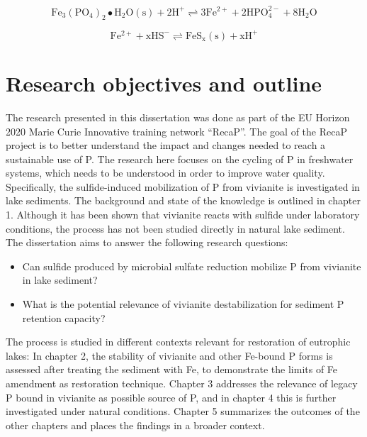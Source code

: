 \documentclass[12pt,twoside]{book}
\providecommand{\tightlist}{%
  \setlength{\itemsep}{0pt}\setlength{\parskip}{0pt}}
\begin{document}
\begin{equation}
  \mathrm{Fe_3(PO_{4})_2\bullet H_2O(s) + 2H^+} \rightleftharpoons \mathrm{3Fe^{2+} + 2HPO_4^{2-} + 8H_2O}
  \label{eq:vivianitedissolve}
\end{equation}

\begin{equation}
  \mathrm{Fe^{2+} + xHS^-} \rightleftharpoons \mathrm{FeS_x(s) + xH^+}
  \label{eq:sulfideform}
\end{equation}

\section{Research objectives and outline}\label{research-objectives-and-outline}

The research presented in this dissertation was done as part of the EU Horizon 2020 Marie Curie Innovative training network ``RecaP''. The goal of the RecaP project is to better understand the impact and changes needed to reach a sustainable use of P. The research here focuses on the cycling of P in freshwater systems, which needs to be understood in order to improve water quality. Specifically, the sulfide-induced mobilization of P from vivianite is investigated in lake sediments. The background and state of the knowledge is outlined in chapter 1. Although it has been shown that vivianite reacts with sulfide under laboratory conditions, the process has not been studied directly in natural lake sediment. The dissertation aims to answer the following research questions:

\begin{itemize}
\tightlist
\item
  Can sulfide produced by microbial sulfate reduction mobilize P from vivianite in lake sediment?
\item
  What is the potential relevance of vivianite destabilization for sediment P retention capacity?
\end{itemize}

The process is studied in different contexts relevant for restoration of eutrophic lakes: In chapter 2, the stability of vivianite and other Fe-bound P forms is assessed after treating the sediment with Fe, to demonstrate the limits of Fe amendment as restoration technique. Chapter 3 addresses the relevance of legacy P bound in vivianite as possible source of P, and in chapter 4 this is further investigated under natural conditions.
Chapter 5 summarizes the outcomes of the other chapters and places the findings in a broader context.
\end{document}
